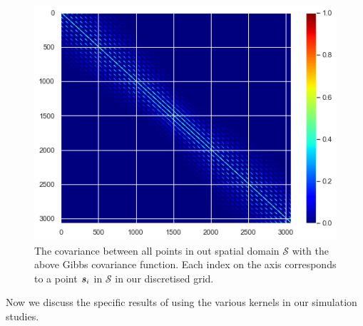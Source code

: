 \begin{figure}
	\centering
	\includegraphics[width=\textwidth]{ex_gibbs}
	\caption[An example Gibbs covariance function evaluated between all spatial grid points.]{The covariance between all points in out spatial domain $\mathcal{S}$ with the above Gibbs covariance function. Each index on the axis corresponds to a point $\bm{{s}}_i$ in $\mathcal{S}$ in our discretised grid.}
	\label{fig:ex_gibbs}
\end{figure}

Now we discuss the specific results of using the various kernels in our simulation studies. 

